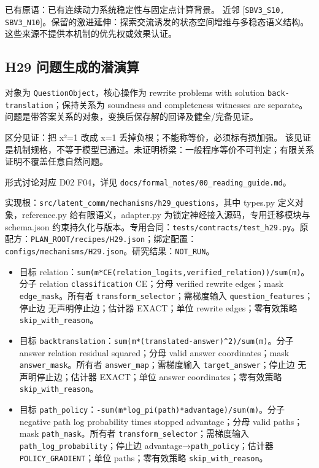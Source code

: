 \documentclass[
  10pt,
]{article}
\begin{document}
已有原语：已有连续动力系统稳定性与固定点计算背景。 近邻
{[}\nolinkurl{SBV3_S10,}
\nolinkurl{SBV3_N10}{]}。保留的激进延伸：探索交流诱发的状态空间增维与多稳态语义结构。
这些来源不提供本机制的优先权或效果认证。

\subsection{H29
问题生成的潜演算}\label{h29-ux95eeux9898ux751fux6210ux7684ux6f5cux6f14ux7b97}

对象为 \nolinkurl{QuestionObject}，核心操作为 rewrite problems with
solution \nolinkurl{back-translation}；保持关系为 soundness and
completeness witnesses are
separate。问题是带答案关系的对象，变换后保存解的回译及健全/完备见证。

区分见证：把 x²=1 改成 x=1 丢掉负根；不能称等价，必须标有损加强。
该见证是机制规格，不等于模型已通过。未证明桥梁：一般程序等价不可判定；有限关系证明不覆盖任意自然问题。

形式讨论对应 D02 F04，详见
{\small\nolinkurl{docs/formal_notes/00_reading_guide.md}}。

实现根：{\small\nolinkurl{src/latent_comm/mechanisms/h29_questions}}，其中
types.py 定义对象，reference.py 给有限语义，adapter.py
为锁定神经接入源码，专用迁移模块与 schema.json
约束持久化与版本。专用合同：{\small\nolinkurl{tests/contracts/test_h29.py}}。原配方：{\small\nolinkurl{PLAN_ROOT/recipes/H29.json}}；绑定配置：{\small\nolinkurl{configs/mechanisms/H29.json}}。研究结果：\nolinkurl{NOT_RUN}。

\begin{itemize}
\item
  目标
  relation：{\small\nolinkurl{sum(m*CE(relation_logits,verified_relation))/sum(m)}}。分子
  relation \nolinkurl{classification} CE；分母 verified rewrite
  edges；mask \nolinkurl{edge_mask}。所有者
  \nolinkurl{transform_selector}；需梯度输入
  \nolinkurl{question_features}；停止边 无声明停止边；估计器 EXACT；单位
  rewrite edges；零有效策略 \nolinkurl{skip_with_reason}。
\item
  目标
  \nolinkurl{backtranslation}：{\small\nolinkurl{sum(m*(translated-answer)^2)/sum(m)}}。分子
  answer relation residual squared；分母 valid answer coordinates；mask
  \nolinkurl{answer_mask}。所有者 \nolinkurl{answer_map}；需梯度输入
  \nolinkurl{target_answer}；停止边 无声明停止边；估计器 EXACT；单位
  answer coordinates；零有效策略 \nolinkurl{skip_with_reason}。
\item
  目标
  \nolinkurl{path_policy}：{\small\nolinkurl{-sum(m*log_pi(path)*advantage)/sum(m)}}。分子
  negative path log probability times stopped advantage；分母 valid
  paths；mask \nolinkurl{path_mask}。所有者
  \nolinkurl{transform_selector}；需梯度输入
  \nolinkurl{path_log_probability}；停止边
  advantage→\nolinkurl{path_policy}；估计器
  \nolinkurl{POLICY_GRADIENT}；单位 paths；零有效策略
  \nolinkurl{skip_with_reason}。
\end{itemize}
\end{document}

